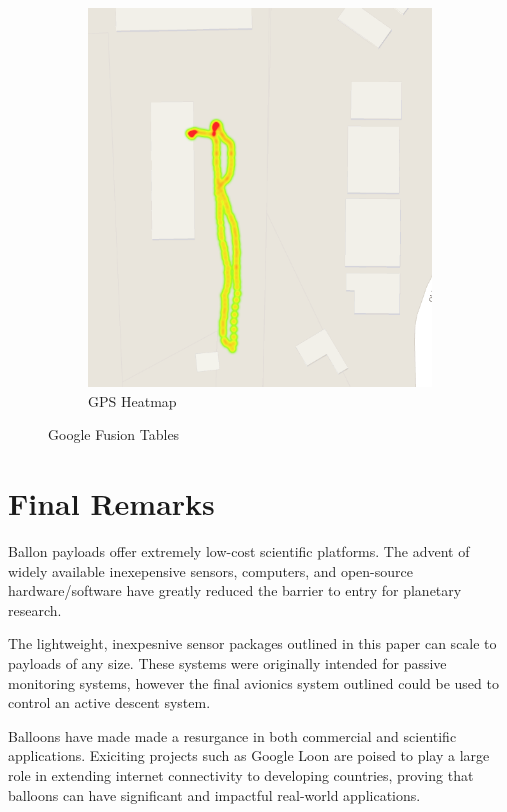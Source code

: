 \documentclass[heading.tex]{subfiles}
\begin{document}
\begin{figure} [hbtp]
\begin{subfigure}[b]{0.45\textwidth}
                \includegraphics[width=\textwidth]{images/heatmap.png}
                \caption{GPS Heatmap}
                \label{fig:heatmap}
        \end{subfigure}
        \caption{Google Fusion Tables}
\end{figure}


\section{Final Remarks}

Ballon payloads offer extremely low-cost scientific platforms.
The advent of widely available inexepensive sensors, computers, and open-source
hardware/software have greatly reduced the barrier to entry for planetary
research.

The lightweight, inexpesnive sensor packages outlined in this paper can
scale to payloads of any size.
These systems were originally intended for passive monitoring systems,
however the final avionics system outlined could be used to control an
active descent system.

Balloons have made made a resurgance in both commercial and scientific applications.
Exiciting projects such as Google Loon are poised to play a large role in
extending internet connectivity to developing countries, proving that balloons
can have significant and impactful real-world applications. \cite{Loon}
\end{document}
